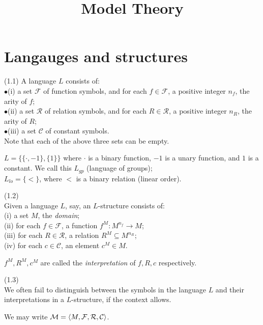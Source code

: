 \documentclass[a4paper]{article}
\begin{document}
\title{Model Theory}

\maketitle

\newpage

\tableofcontents

\newpage

\section{Langauges and structures}

\begin{defi} (1.1)
A language $L$ consists of:\\
$\bullet$(i) a set $\mathcal{F}$ of function symbols, and for each $f \in \mathcal{F}$, a positive integer $n_f$, the arity of $f$;\\
$\bullet$(ii) a set $\mathcal{R}$ of relation symbols, and for each $R \in \mathcal{R}$, a positive integer $n_R$, the arity of $R$;\\
$\bullet$(iii) a set $\mathcal{C}$ of constant symbols.\\
Note that each of the above three sets can be empty.
\end{defi}

\begin{eg}
$L=\{\{\cdot,-1\},\{1\}\}$ where $\cdot$ is a binary function, $-1$ is a unary function, and $1$ is a constant. We call this $L_{gp}$ (language of groups);\\
$L_{lo} = \{<\}$, where $<$ is a binary relation (linear order).
\end{eg}

\begin{defi} (1.2)\\
Given a language $L$, say, an $L$-structure consists of:\\
(i) a set $M$, the \emph{domain};\\
(ii) for each $f \in \mathcal{F}$, a function $f^M:M^{n_f} \to M$;\\
(iii) for each $R \in \mathcal{R}$, a relation $R^M \subseteq M^{n_R}$;\\
(iv) for each $c \in \mathcal{C}$, an element $c^M \in M$.

$f^M,R^M,c^M$ are called the \emph{interpretation} of $f,R,c$ respectively.
\end{defi}

\begin{notation} (1.3)\\
We often fail to distinguish between the symbols in the language $L$ and their interpretations in a $L$-structure, if the context allows.

We may write $\mathcal{M} = \langle M,\mathcal{F},\mathcal{R},\mathcal{C}\rangle$.
\end{notation}
\end{document}
